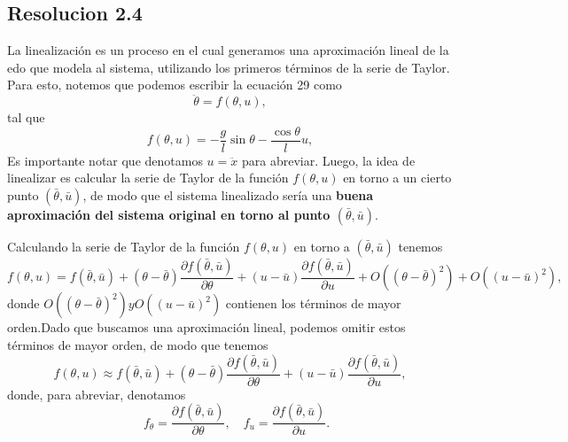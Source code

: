 \documentclass[
  11pt,
  letterpaper,
   addpoints,
   answers
  ]{exam}
\begin{document}
\begin{questions}
\begin{solution}
\subsection*{Resolucion 2.4}
La linealización es un proceso en el cual generamos una aproximación lineal de la edo que modela al sistema, utilizando los primeros términos de la serie de Taylor.
Para esto, notemos que podemos escribir la ecuación 29 como
\begin{equation}
    \ddot{\theta} = f(\theta, u), \tag{30}
\end{equation}
tal que
\begin{equation}
    f(\theta, u) = -\frac{g}{l} \sin \theta - \frac{\cos \theta}{l} u, \tag{31}
\end{equation}
Es importante notar que denotamos \(u = \ddot{x}\) para abreviar. Luego, la idea de linealizar es calcular la serie de Taylor de la función \(f(\theta, u)\) en torno a un cierto punto \((\bar{\theta}, \bar{u})\), de modo que el sistema linealizado sería una \textbf{buena aproximación del sistema original en torno al punto \((\bar{\theta}, \bar{u})\)}.

Calculando la serie de Taylor de la función \(f(\theta, u)\) en torno a \((\bar{\theta}, \bar{u})\) tenemos
\begin{equation}
    f(\theta, u) = f(\bar{\theta}, \bar{u}) + (\theta - \bar{\theta}) \frac{\partial f(\bar{\theta}, \bar{u})}{\partial \theta} + (u - \bar{u}) \frac{\partial f(\bar{\theta}, \bar{u})}{\partial u} + O((\theta - \bar{\theta})^2) + O((u - \bar{u})^2), \tag{32}
\end{equation}
donde \(O((\theta - \bar{\theta})^2) y O((u - \bar{u})^2)\) contienen los términos de mayor orden.Dado que buscamos una aproximación lineal, podemos omitir estos términos de mayor orden, de modo que tenemos
\begin{equation}
    f(\theta, u) \approx f(\bar{\theta}, \bar{u}) + (\theta - \bar{\theta}) \frac{\partial f(\bar{\theta}, \bar{u})}{\partial \theta} + (u - \bar{u}) \frac{\partial f(\bar{\theta}, \bar{u})}{\partial u}, \tag{33}
\end{equation}
donde, para abreviar, denotamos
\begin{equation}
  \quad f_{\theta} = \frac{\partial f(\bar{\theta}, \bar{u})}{\partial \theta}, \quad f_{u} = \frac{\partial f(\bar{\theta}, \bar{u})}{\partial u}. \tag{34}
\end{equation}


\end{solution}
\end{questions}
\end{document}
